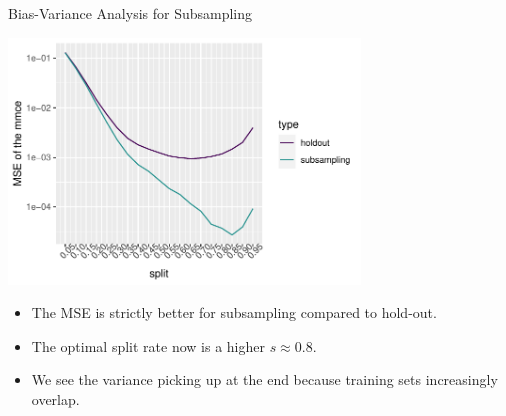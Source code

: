 \documentclass[11pt,compress,t,notes=noshow, xcolor=table]{beamer}
\begin{document}
\begin{vbframe}{Bias-Variance Analysis for Subsampling}
\begin{center}
\includegraphics[width=0.7\textwidth]{figure/eval-resampling-example-2}
\end{center}

\begin{itemize}
  \item The MSE is strictly better for subsampling compared to hold-out.
  \item The optimal split rate now is a higher $s \approx 0.8$.
  \item We see the variance picking up at the end because training sets 
  increasingly overlap.
\end{itemize}

\end{vbframe}

\end{document}
